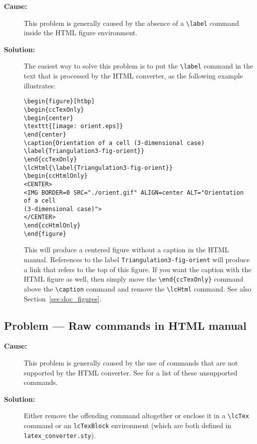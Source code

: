 \begin{description}
\item[{\bf Cause:}] This problem is generally caused by the absence of a
     \verb|\label| command inside the HTML figure environment.

\item[{\bf Solution:}]  
The easiest way to solve this problem is to put the 
\verb|\label| command in the text that is processed by the HTML converter,
as the following example illustrates:

\begin{verbatim}
\begin{figure}[htbp]
\begin{ccTexOnly}
\begin{center}
\texttt{[image: orient.eps]}
\end{center}
\caption{Orientation of a cell (3-dimensional case)
\label{Triangulation3-fig-orient}}
\end{ccTexOnly}
\lcHtml{\label{Triangulation3-fig-orient}}
\begin{ccHtmlOnly}
<CENTER>
<IMG BORDER=0 SRC="./orient.gif" ALIGN=center ALT="Orientation of a cell
(3-dimensional case)">
</CENTER>
\end{ccHtmlOnly}
\end{figure}
\end{verbatim}

This will produce a centered figure without a caption in the HTML manual.
References to the label {\tt Triangulation3-fig-orient} will produce a
link that refers to the top of this figure.  If you want the caption with
the HTML figure as well, then simply move the \verb|\end{ccTexOnly}|
command above the \verb|\caption| command and remove the \verb|\lcHtml|
command. See also Section~\ref{sec:doc_figures}.

\end{description}

\subsection*{Problem --- Raw  commands in HTML manual} 

\begin{description}
\item[{\bf Cause:}] This problem is generally caused by the use of commands
that are not supported by the HTML converter.  See 
 for a list of
these unsupported commands.  

\item[{\bf Solution:}] Either remove the offending command altogether or enclose
it in a \verb|\lcTex| command or an {\tt lcTexBlock} environment (which are
both defined in {\tt latex\_converter.sty}). 
\end{description}

